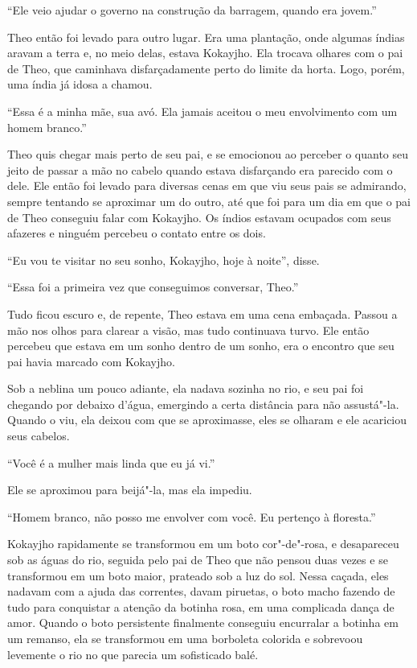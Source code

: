 ``Ele veio ajudar o governo na construção da barragem, quando era
jovem.''

Theo então foi levado para outro lugar. Era uma plantação, onde algumas
índias aravam a terra e, no meio delas, estava Kokayjho. Ela trocava
olhares com o pai de Theo, que caminhava disfarçadamente perto do limite
da horta. Logo, porém, uma índia já idosa a chamou.

``Essa é a minha mãe, sua avó. Ela jamais aceitou o meu envolvimento com
um homem branco.''

Theo quis chegar mais perto de seu pai, e se emocionou ao perceber o
quanto seu jeito de passar a mão no cabelo quando estava disfarçando era
parecido com o dele. Ele então foi levado para diversas cenas em que viu
seus pais se admirando, sempre tentando se aproximar um do outro, até
que foi para um dia em que o pai de Theo conseguiu falar com Kokayjho.
Os índios estavam ocupados com seus afazeres e ninguém percebeu o
contato entre os dois.

``Eu vou te visitar no seu sonho, Kokayjho, hoje à noite'', disse.

``Essa foi a primeira vez que conseguimos conversar, Theo.''

Tudo ficou escuro e, de repente, Theo estava em uma cena embaçada.
Passou a mão nos olhos para clarear a visão, mas tudo continuava turvo.
Ele então percebeu que estava em um sonho dentro de um sonho, era o
encontro que seu pai havia marcado com Kokayjho.

Sob a neblina um pouco adiante, ela nadava sozinha no rio, e seu pai foi
chegando por debaixo d'água, emergindo a certa distância para não
assustá"-la. Quando o viu, ela deixou com que se aproximasse, eles se
olharam e ele acariciou seus cabelos.

``Você é a mulher mais linda que eu já vi.''

Ele se aproximou para beijá"-la, mas ela impediu.

``Homem branco, não posso me envolver com você. Eu pertenço à
floresta.''

Kokayjho rapidamente se transformou em um boto cor"-de"-rosa, e desapareceu
sob as águas do rio, seguida pelo pai de Theo que não pensou duas vezes
e se transformou em um boto maior, prateado sob a luz do sol. Nessa
caçada, eles nadavam com a ajuda das correntes, davam piruetas, o boto
macho fazendo de tudo para conquistar a atenção da botinha rosa, em uma
complicada dança de amor. Quando o boto persistente finalmente conseguiu
encurralar a botinha em um remanso, ela se transformou em uma borboleta
colorida e sobrevoou levemente o rio no que parecia um sofisticado
balé.

